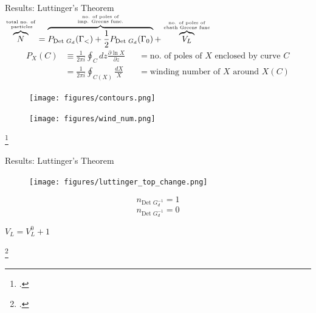 \documentclass[aspectratio=169]{beamer}
\newcommand{\cen}[1]{\begin{center}{#1}\end{center}}
\begin{document}
\begin{frame}[noframenumbering]{Results: Luttinger's Theorem}
	\hspace*{\fill}	{\Large \(\overbrace{N}^{\text{total no. of}\atop{\text{ particles}}} = \overbrace{P_{\text{Det }G_d}(\Gamma_<) + \frac{1}{2}P_{\text{Det }G_d}(\Gamma_0)}^{\text{no. of poles of}\atop{\text{imp. Greens func.}}} + \overbrace{V_L}^{\text{no. of poles of}\atop{\text{cbath Greens func}}}\)}\hspace*{\fill}
\begin{equation*}\begin{aligned}
	P_X(C) &\equiv \frac{1}{2\pi i}\oint_C dz \frac{\partial{\ln X}}{\partial{z}} &&=\text{no. of poles of } X \text{ enclosed by curve }C \\
	       &= \frac{1}{2\pi i}\oint_{C(X)} \frac{dX}{X} &&= \text{winding number of } X \text{ around }X(C)
\end{aligned}\end{equation*}
\begin{minipage}{0.4\textwidth}
	\begin{figure}[htpb]
		\centering
		\texttt{[image: figures/contours.png]}
	\end{figure}
\end{minipage}
\hspace*{0.15\textwidth}
\begin{minipage}{0.4\textwidth}
	\begin{figure}[htpb]
		\centering
		\texttt{[image: figures/wind\_num.png]}
	\end{figure}
\end{minipage}
\footcite{seki}
\end{frame}

\begin{frame}[noframenumbering]{Results: Luttinger's Theorem}
\begin{minipage}{0.6\textwidth}
\begin{figure}[htpb]
	\centering
	\texttt{[image: figures/luttinger\_top\_change.png]}
\end{figure}
\end{minipage}
\begin{minipage}{0.39\textwidth}
	\vspace*{5pt}
	{\large \[n_{\text{Det }G_d^{-1}} = 1\]
	\vspace*{45pt}
	\[n_{\text{Det }G_d^{-1}} = 0\]}
\end{minipage}
\vspace*{10pt}
\cen{
	\Large
	\(V_L = V_L^0 + 1\)
}
\footcite{martin}
\end{frame}
\end{document}
